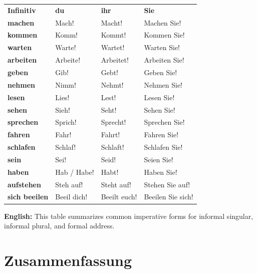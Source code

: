 \documentclass[a4paper,11pt]{article}
\newcommand{\TableEnglish}[1]{{\small\color{SoftGray}\textbf{English: }#1\par}}
\begin{document}
        \begin{longtable}{>{\bfseries}p{2.7cm}|p{3.4cm}|p{3.4cm}|p{4.8cm}}
            \rowcolor{HeaderBlueDark}
            \color{white}\textbf{Infinitiv} &
            \color{white}\textbf{du} &
            \color{white}\textbf{ihr} &
            \color{white}\textbf{Sie} \\
            machen & Mach! & Macht! & Machen Sie! \\
            kommen & Komm! & Kommt! & Kommen Sie! \\
            warten & Warte! & Wartet! & Warten Sie! \\
            arbeiten & Arbeite! & Arbeitet! & Arbeiten Sie! \\
            geben & Gib! & Gebt! & Geben Sie! \\
            nehmen & Nimm! & Nehmt! & Nehmen Sie! \\
            lesen & Lies! & Lest! & Lesen Sie! \\
            sehen & Sieh! & Seht! & Sehen Sie! \\
            sprechen & Sprich! & Sprecht! & Sprechen Sie! \\
            fahren & Fahr! & Fahrt! & Fahren Sie! \\
            schlafen & Schlaf! & Schlaft! & Schlafen Sie! \\
            sein & Sei! & Seid! & Seien Sie! \\
            haben & Hab / Habe! & Habt! & Haben Sie! \\
            aufstehen & Steh auf! & Steht auf! & Stehen Sie auf! \\
            sich beeilen & Beeil dich! & Beeilt euch! & Beeilen Sie sich! \\
        \end{longtable}
        \TableEnglish{This table summarizes common imperative forms for informal singular, informal plural, and formal address.}

    \section{Zusammenfassung}
\end{document}
